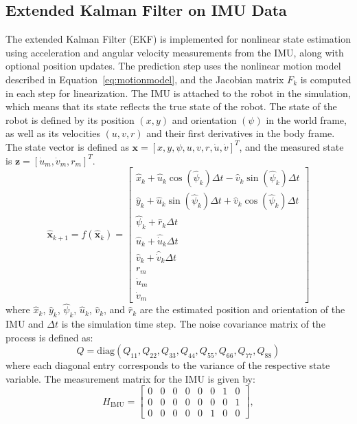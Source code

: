 \documentclass{ifacconf}
\begin{document}
\subsection{Extended Kalman Filter on IMU Data}
The extended Kalman Filter (EKF) is implemented for nonlinear state estimation using acceleration and angular velocity measurements from the IMU, along with optional position updates. The prediction step uses the nonlinear motion model described in Equation~\ref{eq:motionmodel}, and the Jacobian matrix \( F_k \) is computed in each step for linearization. The IMU is attached to the robot in the simulation, which means that its state reflects the true state of the robot. The state of the robot is defined by its position $(x, y)$ and orientation $(\psi)$ in the world frame, as well as its velocities $(u, v, r)$ and their first derivatives in the body frame. The state vector is defined as \( \mathbf{x} = [x, y, \psi, u, v, r, \dot{u}, \dot{v}]^T \), and the measured state is \( \mathbf{z} = [\dot{u}_m, \dot{v}_m, r_m]^T \).
\begin{equation}
    \hat{\mathbf{x}}_{k+1} =
    f(\hat{\mathbf{x}}_k) =
    \begin{bmatrix}
    \hat{x}_k + \hat{u}_k \cos(\hat{\psi}_k) \Delta t - \hat{v}_k \sin(\hat{\psi}_k) \Delta t \\
    \hat{y}_k + \hat{u}_k \sin(\hat{\psi}_k) \Delta t + \hat{v}_k \cos(\hat{\psi}_k) \Delta t \\
    \hat{\psi}_k + \hat{r}_k \Delta t \\
    \hat{u}_k + \hat{\dot{u}}_k \Delta t \\
    \hat{v}_k + \hat{\dot{v}}_k \Delta t \\
    r_{m} \\
    \dot{u}_{m} \\
    \dot{v}_{m}
    \end{bmatrix}
    \label{eq:motionmodel}
\end{equation}
where $\hat{x}_k$, $\hat{y}_k$, $\hat{\psi}_k$, $\hat{u}_k$, $\hat{v}_k$, and $\hat{r}_k$ are the estimated position and orientation of the IMU and $\Delta t$ is the simulation time step.  The noise covariance matrix of the process is defined as:
\begin{equation}
    Q = \mathrm{diag}(Q_{11}, Q_{22}, Q_{33}, Q_{44}, Q_{55}, Q_{66}, Q_{77}, Q_{88})
\end{equation}
where each diagonal entry corresponds to the variance of the respective state variable. The measurement matrix for the IMU is given by:
\begin{equation}
    H_{\text{IMU}} = \begin{bmatrix}
        0 & 0 & 0 & 0 & 0 & 0 & 1 & 0 \\
        0 & 0 & 0 & 0 & 0 & 0 & 0 & 1 \\
        0 & 0 & 0 & 0 & 0 & 1 & 0 & 0
    \end{bmatrix},
\end{equation}
\end{document}
